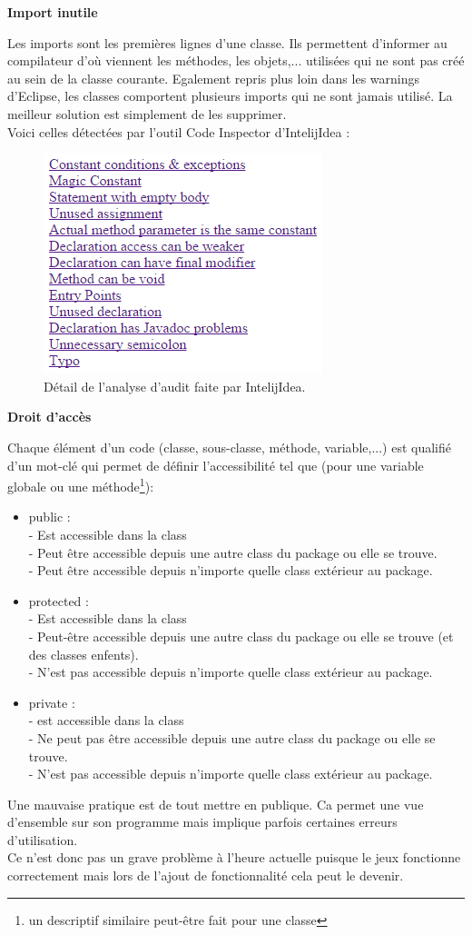 \documentclass[12pt,a4paper,final]{article}
\newcommand{\smalltitle}[1]{\bigskip\large\textbf{#1}\par\normalsize\medskip}
\begin{document}
\smalltitle{Import inutile}
Les imports sont les premières lignes d'une classe. Ils permettent d'informer au compilateur d'où viennent les méthodes, les objets,... utilisées qui ne sont pas créé au sein de la classe courante.
Egalement repris plus loin dans les warnings d'Eclipse, les classes comportent plusieurs imports qui ne sont jamais utilisé.
La meilleur solution est simplement de les supprimer.\\
Voici celles détectées par l'outil Code Inspector d'IntelijIdea : 
\begin{figure}[!h]
	\centering
	\includegraphics[maxwidth=\textwidth]{AuditII.png}
	\caption{\label{Audit}Détail de l'analyse d'audit faite par IntelijIdea.}
\end{figure}

\smalltitle{Droit d'accès}
Chaque élément d'un code (classe, sous-classe, méthode, variable,...) est qualifié d'un mot-clé qui permet de définir l'accessibilité tel que (pour une variable globale ou une méthode\footnote{un descriptif similaire peut-être fait pour une classe}): 
\begin{itemize}
\item public : \\
- Est accessible dans la class\\
- Peut être accessible depuis une autre class du package ou elle se trouve.\\
- Peut être accessible depuis n'importe quelle class extérieur au package.
\item protected :\\
- Est accessible dans la class\\
- Peut-être accessible depuis une autre class du package ou elle se trouve (et des classes enfents).\\
- N'est pas accessible depuis n'importe quelle class extérieur au package.
\item private :\\
- est accessible dans la class\\
- Ne peut pas être accessible depuis une autre class du package ou elle se trouve.\\
- N'est pas accessible depuis n'importe quelle class extérieur au package.
\end{itemize}
Une mauvaise pratique est de tout mettre en publique. Ca permet une vue d'ensemble sur son programme mais implique parfois certaines erreurs d'utilisation.\\
Ce n'est donc pas un grave problème à l'heure actuelle puisque le jeux fonctionne correctement mais lors de l'ajout de fonctionnalité cela peut le devenir.
\end{document}
